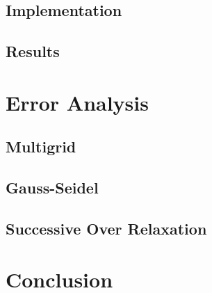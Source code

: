 \documentclass[pdftex,12pt,a4paper]{article}
\begin{document}
    \subsection{Implementation}   
        \paragraph*{}

    \subsection{Results}
        \paragraph*{}

\section{Error Analysis}
    
    \subsection{Multigrid}   
        \paragraph*{}

    \subsection{Gauss-Seidel}
        \paragraph*{}

    \subsection{Successive Over Relaxation}
        \paragraph*{}

\section{Conclusion}
\end{document}
